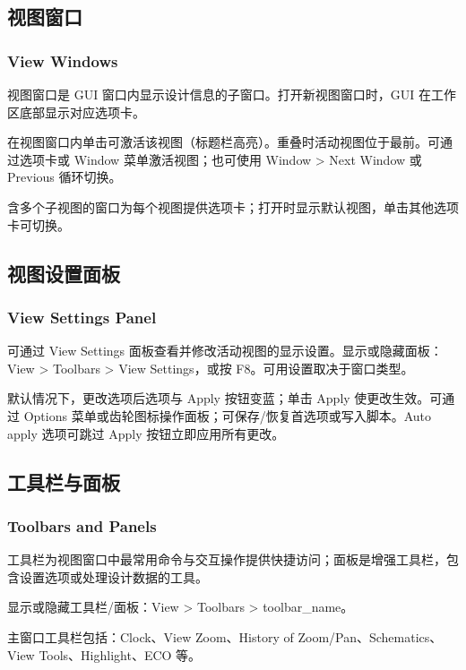 \subsection{视图窗口}
\subsubsection*{View Windows}

视图窗口是 GUI 窗口内显示设计信息的子窗口。打开新视图窗口时，GUI 在工作区底部显示对应选项卡。

在视图窗口内单击可激活该视图（标题栏高亮）。重叠时活动视图位于最前。可通过选项卡或 Window 菜单激活视图；也可使用 Window > Next Window 或 Previous 循环切换。

含多个子视图的窗口为每个视图提供选项卡；打开时显示默认视图，单击其他选项卡可切换。

\subsection{视图设置面板}
\subsubsection*{View Settings Panel}

可通过 View Settings 面板查看并修改活动视图的显示设置。显示或隐藏面板：View > Toolbars > View Settings，或按 F8。可用设置取决于窗口类型。

默认情况下，更改选项后选项与 Apply 按钮变蓝；单击 Apply 使更改生效。可通过 Options 菜单或齿轮图标操作面板；可保存/恢复首选项或写入脚本。Auto apply 选项可跳过 Apply 按钮立即应用所有更改。


\subsection{工具栏与面板}
\subsubsection*{Toolbars and Panels}

工具栏为视图窗口中最常用命令与交互操作提供快捷访问；面板是增强工具栏，包含设置选项或处理设计数据的工具。

显示或隐藏工具栏/面板：View > Toolbars > toolbar\_name。

主窗口工具栏包括：Clock、View Zoom、History of Zoom/Pan、Schematics、View Tools、Highlight、ECO 等。

